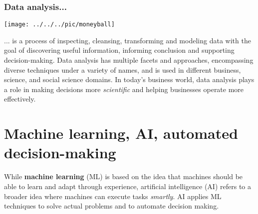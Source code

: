 \subsubsection*{Data analysis...}
\begin{minipage}{0.25\textwidth}	
	\texttt{[image: ../../../pic/moneyball]}
\end{minipage}
\begin{minipage}{0.75\textwidth}
	... is a process of inspecting, cleansing, transforming and modeling data with the goal of discovering useful information, informing conclusion and supporting decision-making. Data analysis has multiple facets and approaches, encompassing diverse techniques under a variety of names, and is used in different business, science, and social science domains. In today's business world, data analysis plays a role in making decisions more \textit{scientific} and helping businesses operate more effectively.
	
\end{minipage}




\section{Machine learning, AI, automated decision-making}


While \textbf{machine learning} (ML) is based on the idea that machines should be able to learn and adapt through experience, artificial intelligence (AI) refers to a broader idea where machines can execute tasks \textit{smartly}. AI applies ML techniques to solve actual problems and to automate decision making.


